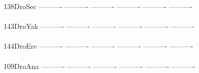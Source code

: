 \documentclass[11pt,twoside,reqno,a4paper]{article}
\begin{document}
{138\hspace*{2\charwidth}DroSec	----------	----------	----------	----------	----------	----------	\\
\hspace*{5\charwidth}\hspace*{7\charwidth}\hspace*{1\charwidth}\hspace*{1\charwidth}\hspace*{1\charwidth}\hspace*{1\charwidth}\hspace*{1\charwidth}\hspace*{1\charwidth}\\
143\hspace*{2\charwidth}DroYak	----------	----------	----------	----------	----------	----------	\\
\hspace*{5\charwidth}\hspace*{7\charwidth}\hspace*{1\charwidth}\hspace*{1\charwidth}\hspace*{1\charwidth}\hspace*{1\charwidth}\hspace*{1\charwidth}\hspace*{1\charwidth}\\
144\hspace*{2\charwidth}DroEre	----------	----------	----------	----------	----------	----------	\\
\hspace*{5\charwidth}\hspace*{7\charwidth}\hspace*{1\charwidth}\hspace*{1\charwidth}\hspace*{1\charwidth}\hspace*{1\charwidth}\hspace*{1\charwidth}\hspace*{1\charwidth}\\
109\hspace*{2\charwidth}DroAna	----------	----------	----------	----------	----------	----------	\\
\hspace*{5\charwidth}\hspace*{7\charwidth}\hspace*{1\charwidth}\hspace*{1\charwidth}\hspace*{1\charwidth}\hspace*{1\charwidth}\hspace*{1\charwidth}\hspace*{1\charwidth}\\
}
\end{document}
